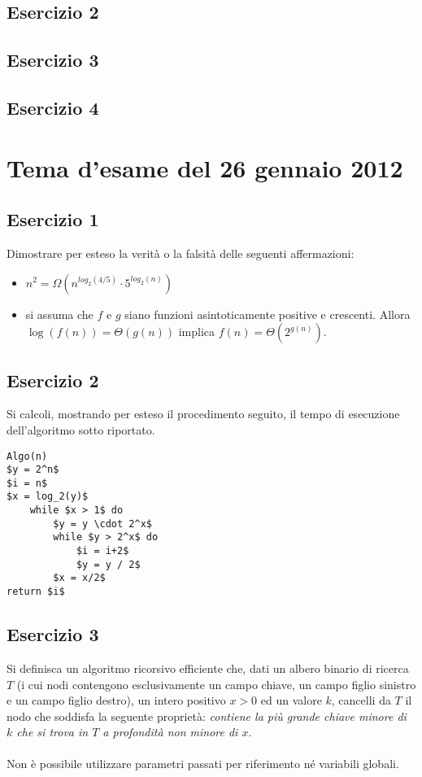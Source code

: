 \documentclass[11pt,a4paper,oneside]{article}
\begin{document}
\subsection*{Esercizio 2}
\subsection*{Esercizio 3}
\subsection*{Esercizio 4}
\pagebreak
%
%
\section*{Tema d'esame del 26 gennaio 2012}
\subsection*{Esercizio 1} Dimostrare per esteso la verità o la falsità delle seguenti affermazioni:
\begin{itemize}
	\item $n^2 = \Omega \left(n^{log_2{(4/5)}} \cdot 5^{log_2{(n)}}\right)$
	\item si assuma che $f$ e $g$ siano funzioni asintoticamente positive e crescenti. Allora \linebreak $\log(f(n)) = \Theta(g(n))$ implica $f(n) = \Theta(2^{g(n)})$.
\end{itemize}
\subsection*{Esercizio 2} Si calcoli, mostrando per esteso il procedimento seguito, il tempo di esecuzione dell'algoritmo sotto riportato.

\begin{lstlisting}[mathescape=true]
Algo(n)
$y = 2^n$
$i = n$
$x = log_2(y)$
	while $x > 1$ do
		$y = y \cdot 2^x$
		while $y > 2^x$ do
			$i = i+2$
			$y = y / 2$
		$x = x/2$
return $i$
\end{lstlisting}
\subsection*{Esercizio 3} Si definisca un algoritmo ricorsivo efficiente che, dati un albero binario di ricerca $T$ (i cui nodi contengono esclusivamente un campo chiave, un campo figlio sinistro e un campo figlio destro), un intero positivo $x > 0$ ed un valore $k$, cancelli da $T$ il nodo che soddisfa la seguente proprietà: \textit{contiene la più grande chiave minore di $k$ che si trova in $T$ a profondità non minore di $x$}.\\\\Non è possibile utilizzare parametri passati per riferimento né variabili globali.
\end{document}
